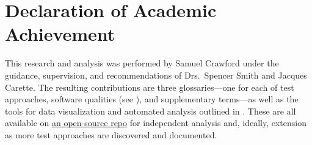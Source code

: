 \chapter{Declaration of Academic Achievement}
\label{chap:declaration_of_academic_achievement}

This research and analysis was performed by Samuel Crawford under the
guidance, supervision, and recommendations of Drs.~Spencer Smith and
Jacques Carette. The resulting contributions are three glossaries---one for
each of test approaches, software qualities (see ), and
supplementary terms---as well as the tools for data visualization and
automated analysis outlined in . These are all available on
\href{https://github.com/samm82/TestingTesting}{an open-source repo}
for independent analysis and, ideally, extension as more test approaches are
discovered and documented.
